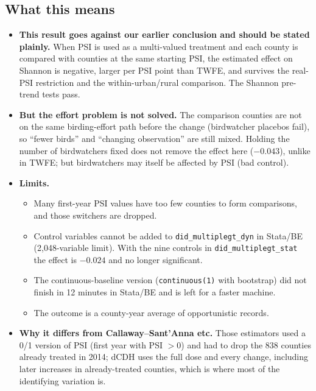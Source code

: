 \documentclass[11pt]{article}
\begin{document}
\subsection{What this means}
\begin{answerbox}
\begin{itemize}[leftmargin=14pt,itemsep=2pt,topsep=2pt]
\item \textbf{This result goes against our earlier conclusion and should be stated plainly.} When PSI is used as a multi-valued treatment and each county is compared with counties at the same starting PSI, the estimated effect on Shannon is negative, larger per PSI point than TWFE, and survives the real-PSI restriction and the within-urban/rural comparison. The Shannon pre-trend tests pass.
\item \textbf{But the effort problem is not solved.} The comparison counties are not on the same birding-effort path before the change (birdwatcher placebos fail), so ``fewer birds'' and ``changing observation'' are still mixed. Holding the number of birdwatchers fixed does not remove the effect here ($-0.043$), unlike in TWFE; but birdwatchers may itself be affected by PSI (bad control).
\item \textbf{Limits.}
\begin{itemize}[leftmargin=12pt,itemsep=1pt]
\item Many first-year PSI values have too few counties to form comparisons, and those switchers are dropped.
\item Control variables cannot be added to \texttt{did\_multiplegt\_dyn} in Stata/BE (2,048-variable limit). With the nine controls in \texttt{did\_multiplegt\_stat} the effect is $-0.024$ and no longer significant.
\item The continuous-baseline version (\texttt{continuous(1)} with bootstrap) did not finish in 12 minutes in Stata/BE and is left for a faster machine.
\item The outcome is a county-year average of opportunistic records.
\end{itemize}
\item \textbf{Why it differs from Callaway--Sant'Anna etc.} Those estimators used a 0/1 version of PSI (first year with PSI $>0$) and had to drop the 838 counties already treated in 2014; dCDH uses the full dose and every change, including later increases in already-treated counties, which is where most of the identifying variation is.
\end{itemize}
\end{answerbox}
\end{document}
